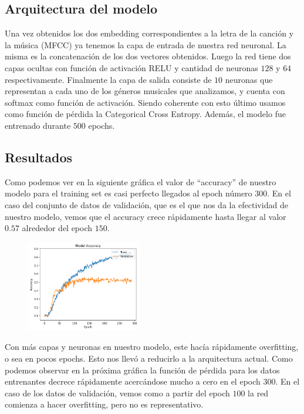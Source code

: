 \documentclass[colorinlistoftodos,twoside,twocolumn,10pt]{article} %
\begin{document}
\subsection{Arquitectura del modelo}

Una vez obtenidos los dos embedding correspondientes a la letra de la canci\'on y la m\'usica (MFCC) ya tenemos la capa de entrada de nuestra red neuronal. La misma es la concatenaci\'on de los dos vectores obtenidos. Luego la red tiene  dos capas ocultas con funci\'on de activaci\'on RELU y cantidad de neuronas $128$ y $64$ respectivamente. Finalmente la capa de salida consiste de $10$ neuronas que representan a cada uno de los g\'eneros musicales que analizamos, y cuenta con softmax como funci\'on de activaci\'on. Siendo coherente con esto \'ultimo usamos como funci\'on de p\'erdida la Categorical Cross Entropy. Adem\'as, el modelo fue entrenado durante $500$ epochs.


\subsection{Resultados}

Como podemos ver en la siguiente gr\'afica el valor de ``accuracy'' de nuestro modelo para el training set es casi perfecto llegados al epoch n\'umero $300$. En el caso del conjunto de  datos de validaci\'on, que es el que nos da la efectividad de nuestro modelo, vemos que el accuracy crece r\'apidamente hasta llegar al valor $0.57$ alrededor del epoch $150$.

 \begin{figure}[h!]
 	\includegraphics[width=5cm]{vl_accuracy.png}
 \end{figure}

Con m\'as capas y neuronas en nuestro modelo, este hac\'ia r\'apidamente overfitting, o sea en pocos epochs. Esto nos llev\'o a reducirlo a la arquitectura actual. Como podemos observar en la pr\'oxima gr\'afica la funci\'on de p\'erdida para los datos entrenantes decrece r\'apidamente acerc\'andose mucho a cero en el epoch $300$. En el caso de los datos de validaci\'on, vemos como a partir del epoch $100$ la red comienza a hacer overfitting, pero no es representativo. 
\end{document}
